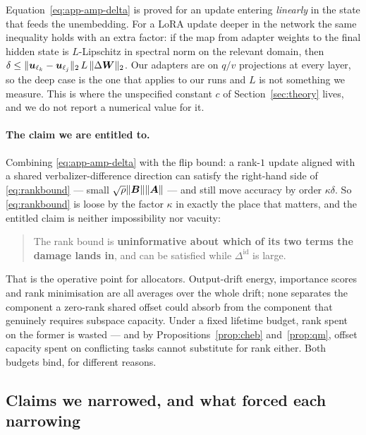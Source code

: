 \begin{remark}
\label{rem:amp-scope}
Equation~\eqref{eq:app-amp-delta} is proved for an update entering \emph{linearly}
in the state that feeds the unembedding. For a LoRA update deeper in the network the
same inequality holds with an extra factor: if the map from adapter weights to the
final hidden state is $L$-Lipschitz in spectral norm on the relevant domain, then
$\delta\le\|\bm{u}_{\ell_k}-\bm{u}_{\ell_j}\|_2\,L\,\|\Delta\bm{W}\|_2$. Our adapters are on
$q/v$ projections at every layer, so the deep case is the one that applies to our
runs and $L$ is not something we measure. This is where the unspecified constant $c$
of Section~\ref{sec:theory} lives, and we do not report a numerical value for it.
\end{remark}

\paragraph{The claim we are entitled to.}
Combining \eqref{eq:app-amp-delta} with the flip bound: a rank-$1$ update aligned
with a shared verbalizer-difference direction can satisfy the right-hand side of
\eqref{eq:rankbound} --- small $\sqrt{\rho}\|\bm{B}\|\|\bm{A}\|$ --- and still move
accuracy by order $\kappa\delta$. So \eqref{eq:rankbound} is loose by the factor
$\kappa$ in exactly the place that matters, and the entitled claim is neither
impossibility nor vacuity:

\begin{quote}
The rank bound is \textbf{uninformative about which of its two terms the damage
lands in}, and can be satisfied while $\Delta^{\mathrm{id}}$ is large.
\end{quote}

That is the operative point for allocators. Output-drift energy, importance scores
and rank minimisation are all averages over the whole drift; none separates the
component a zero-rank shared offset could absorb from the component that genuinely
requires subspace capacity. Under a fixed lifetime budget, rank spent on the former
is wasted --- and by Propositions~\ref{prop:cheb} and~\ref{prop:qm}, offset capacity
spent on conflicting tasks cannot substitute for rank either. Both budgets bind, for
different reasons.

\subsection{Claims we narrowed, and what forced each narrowing}
\label{app:narrowed}

